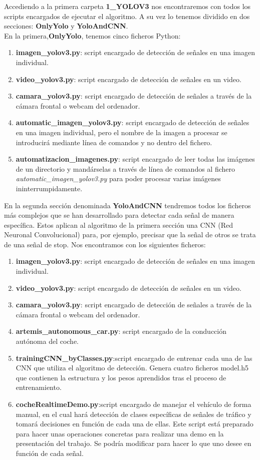 Accediendo a la primera carpeta \textbf{1_YOLOV3} nos encontraremos con todos los scripts encargados de ejecutar el algoritmo. A su vez lo tenemos dividido en dos secciones: \textbf{OnlyYolo} y \textbf{YoloAndCNN}. \\
En la primera,\textbf{OnlyYolo}, tenemos cinco ficheros Python:

\begin{enumerate}
\item \textbf{imagen_yolov3.py}: script encargado de detección de señales en una imagen individual.
\item \textbf{video_yolov3.py}: script encargado de detección de señales en un video.
\item \textbf{camara_yolov3.py}: script encargado de detección de señales a través de la cámara frontal o webcam del ordenador.
\item \textbf{automatic_imagen_yolov3.py}: script encargado de detección de señales en una imagen individual, pero el nombre de la imagen a procesar se introducirá mediante línea de comandos y no dentro del fichero.
\item \textbf{automatizacion_imagenes.py}: script encargado de leer todas las imágenes de un directorio y mandárselas a través de línea de comandos al fichero \textit{automatic_imagen_yolov3.py} para poder procesar varias imágenes ininterrumpidamente.
\end{enumerate}

En la segunda sección denominada \textbf{YoloAndCNN} tendremos todos los ficheros más complejos que se han desarrollado para detectar cada señal de manera específica. Estos aplican al algoritmo de la primera sección una CNN (Red Neuronal Convolucional) para, por ejemplo, precisar que la señal de otros se trata de una señal de stop. Nos encontramos con los siguientes ficheros:

\begin{enumerate}
\item \textbf{imagen_yolov3.py}: script encargado de detección de señales en una imagen individual.
\item \textbf{video_yolov3.py}: script encargado de detección de señales en un video.
\item \textbf{camara_yolov3.py}: script encargado de detección de señales a través de la cámara frontal o webcam del ordenador.
\item \textbf{artemis_autonomous_car.py}: script encargado de la conducción autónoma del coche.
\item \textbf{trainingCNN_byClasses.py}:script encargado de entrenar cada una de las CNN que utiliza el algoritmo de detección. Genera cuatro ficheros model.h5 que contienen la estructura y los pesos aprendidos tras el proceso de entrenamiento.
\item \textbf{cocheRealtimeDemo.py}:script encargado de manejar el vehículo de forma manual, en el cual hará detección de clases específicas de señales de tráfico y tomará decisiones en función de cada una de ellas. Este script está preparado para hacer unas operaciones concretas para realizar una demo en la presentación del trabajo. Se podría modificar para hacer lo que uno desee en función de cada señal.
\end{enumerate}

